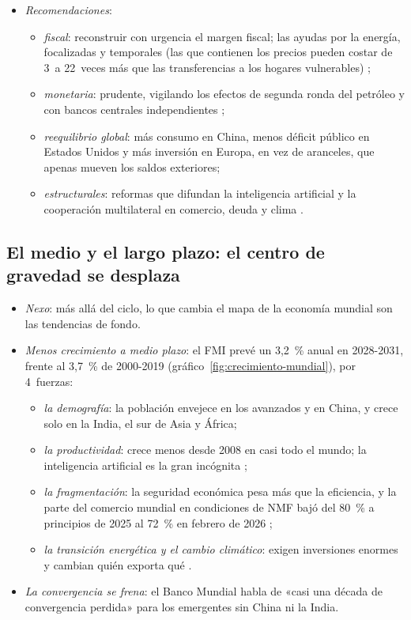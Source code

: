 \documentclass[11pt]{article}
\begin{document}
\begin{itemize}
\item \emph{Recomendaciones}\nocite{FMI2026WEO,FMI2026ESR}:
  \begin{itemize}
  \item \emph{fiscal}: reconstruir con urgencia el margen fiscal; las ayudas por la energía, focalizadas y temporales (las que contienen los precios pueden costar de 3~a 22~veces más que las transferencias a los hogares vulnerables) ;
  \item \emph{monetaria}: prudente, vigilando los efectos de segunda ronda del petróleo y con bancos centrales independientes ;
  \item \emph{reequilibrio global}: más consumo en China, menos déficit público en Estados Unidos y más inversión en Europa, en vez de aranceles, que apenas mueven los saldos exteriores;
  \item \emph{estructurales}: reformas que difundan la inteligencia artificial y la cooperación multilateral en comercio, deuda y clima .
  \end{itemize}
\end{itemize}

\subsection{El medio y el largo plazo: el centro de gravedad se desplaza}\label{sec:largo-plazo}

\begin{itemize}
\item \emph{Nexo}: más allá del ciclo, lo que cambia el mapa de la economía mundial son las tendencias de fondo.
\item \emph{Menos crecimiento a medio plazo}: el FMI prevé un 3,2~\% anual en 2028-2031, frente al 3,7~\% de 2000-2019 (gráfico~\ref{fig:crecimiento-mundial})\nocite{FMI2026WEO}, por 4~fuerzas:
  \begin{itemize}
  \item \emph{la demografía}: la población envejece en los avanzados y en China, y crece solo en la India, el sur de Asia y África;
  \item \emph{la productividad}: crece menos desde 2008 en casi todo el mundo; la inteligencia artificial es la gran incógnita ;
  \item \emph{la fragmentación}: la seguridad económica pesa más que la eficiencia, y la parte del comercio mundial en condiciones de NMF bajó del 80~\% a principios de 2025 al 72~\% en febrero de 2026\nocite{OMC2026GTOS} ;
  \item \emph{la transición energética y el cambio climático}: exigen inversiones enormes y cambian quién exporta qué .
  \end{itemize}
\item \emph{La convergencia se frena}: el Banco Mundial habla de «casi una década de convergencia perdida» para los emergentes sin China ni la India\nocite{BM2026GEP}.
\end{itemize}
\end{document}

